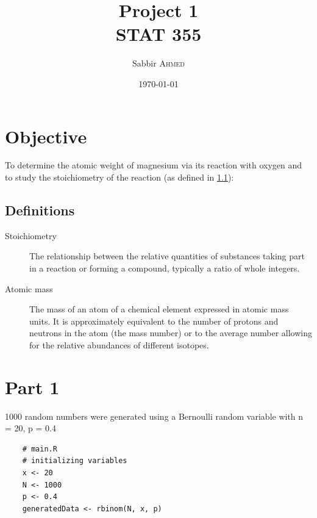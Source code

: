 \documentclass{article}
\title{Project 1 \\ STAT 355} %
\author{Sabbir \textsc{Ahmed}} %
\date{\today} %
\begin{document}
    \maketitle %



    \section{Objective}
    To determine the atomic weight of magnesium via its reaction with oxygen and to study the stoichiometry of the reaction (as defined in \ref{definitions}):

        \subsection{Definitions}
        \label{definitions}
            \begin{description}
                \item[Stoichiometry]
                The relationship between the relative quantities of substances taking part in a reaction or forming a compound, typically a ratio of whole integers.
                \item[Atomic mass]
                The mass of an atom of a chemical element expressed in atomic mass units. It is approximately equivalent to the number of protons and neutrons in the atom (the mass number) or to the average number allowing for the relative abundances of different isotopes. 
            \end{description} 


    \section{Part 1}
        1000 random numbers were generated using a Bernoulli random variable with n = 20, p = 0.4
\begin{lstlisting}
    # main.R
    # initializing variables
    x <- 20
    N <- 1000
    p <- 0.4
    generatedData <- rbinom(N, x, p)
\end{lstlisting}
\end{document}
